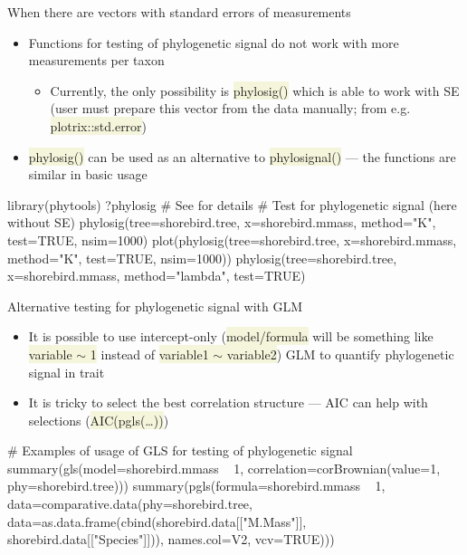 \documentclass[compress, ucs, xelatex, 11pt, xcolor=svgnames, aspectratio=169,
	hyperref={
		bookmarks=true,
		unicode=true,
		colorlinks=true,
		pdftitle={Molecular data in R},
		plainpages=false,
		pdfauthor={Vojtech Zeisek},
		pdfsubject={Course about phylogeny and evolution in R},
		pdfcreator={XeLaTeX},
		pdfkeywords={R, evolution, phylogeny, molecular data},
		linkcolor=Crimson, %
		anchorcolor=Magenta, %
		citecolor=Magenta, %
		filecolor=Magenta, %
		menucolor=Magenta, %
		urlcolor=DodgerBlue, %
		pdftex},
	url={hyphens, lowtilde} %
	]{beamer}
\renewcommand{\texttt}[1]{\colorbox{Beige}{{\ttfamily #1}}}
\begin{document}
\begin{frame}[fragile]{When there are vectors with standard errors of measurements}
	\begin{itemize}
		\item Functions for testing of phylogenetic signal do not work with more measurements per taxon
		\begin{itemize}
			\item Currently, the only possibility is \texttt{phylosig()} which is able to work with SE (user must prepare this vector from the data manually; from e.g. \texttt{plotrix::std.error})
		\end{itemize}
		\item \texttt{phylosig()} can be used as an alternative to \texttt{phylosignal()} --- the functions are similar in basic usage
	\end{itemize}
	\begin{spluscode}
    library(phytools)
    ?phylosig # See for details
    # Test for phylogenetic signal (here without SE)
    phylosig(tree=shorebird.tree, x=shorebird.mmass, method="K", test=TRUE,
      nsim=1000)
    plot(phylosig(tree=shorebird.tree, x=shorebird.mmass, method="K",
      test=TRUE, nsim=1000))
    phylosig(tree=shorebird.tree, x=shorebird.mmass, method="lambda",
      test=TRUE)
	\end{spluscode}
\end{frame}

\begin{frame}[fragile]{Alternative testing for phylogenetic signal with GLM}
	\begin{itemize}
		\item It is possible to use intercept-only (\texttt{model/formula} will be something like \texttt{variable $\sim$ 1} instead of \texttt{variable1 $\sim$ variable2}) GLM to quantify phylogenetic signal in trait
		\item It is tricky to select the best correlation structure --- AIC can help with selections (\texttt{AIC(pgls(\ldots))})
	\end{itemize}
	\begin{spluscode}
    # Examples of usage of GLS for testing of phylogenetic signal
    summary(gls(model=shorebird.mmass ~ 1,
      correlation=corBrownian(value=1, phy=shorebird.tree)))
    summary(pgls(formula=shorebird.mmass ~ 1,
      data=comparative.data(phy=shorebird.tree,
      data=as.data.frame(cbind(shorebird.data[["M.Mass"]],
      shorebird.data[["Species"]])), names.col=V2, vcv=TRUE)))
	\end{spluscode}
\end{frame}
\end{document}
